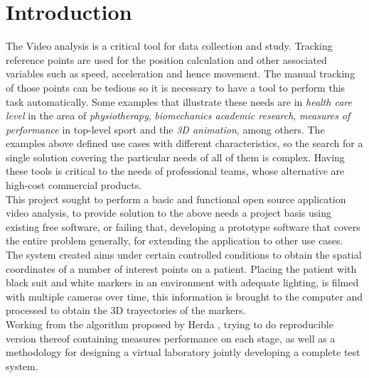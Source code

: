 \section{Introduction}

The Video analysis is a critical tool for data collection and study. Tracking reference points are used for the position calculation and other associated variables such as speed, acceleration and hence movement.
The manual tracking of those points can be tedious so it is necessary to have a tool to perform this task automatically. 
Some examples that illustrate these needs are in \emph{health care level} in the area of \emph{physiotherapy}, \emph{biomechanics academic research},
\emph{measures of performance} in top-level sport and the \emph{3D animation}, among others.
The examples above defined use cases with different characteristics, so the search for a single solution covering the particular needs of all of them is complex. Having these tools is critical to the needs of professional teams, whose alternative are high-cost commercial products.\\
\hspace*{0.5cm}This project sought to perform a basic and functional open source application video analysis, to provide solution to the above needs a project basis using existing free software, or failing that, developing a prototype software that covers the entire problem generally, for extending the application to other use cases.\\
\hspace*{0.5cm}The system created aims under certain controlled conditions to obtain the spatial coordinates of a number of interest points on a patient.
Placing the patient with black suit and white markers in an environment with adequate lighting, is filmed with multiple cameras over time, this information is brought to the computer and processed to obtain the 3D trayectories of the markers.\\
\hspace*{0.5cm}Working from the algorithm proposed by Herda \cite{herda}, trying to do reproducible version thereof containing measures performance on each stage,  as well as a methodology for designing a virtual laboratory jointly developing a complete test system.

